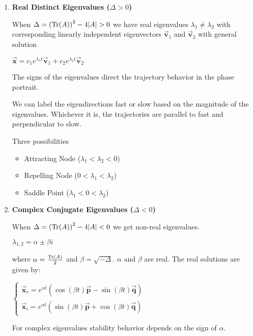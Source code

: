 \documentclass[12pt,landscape,twocolumn]{article}
\let\oldvec\vec
\renewcommand{\vec}[1]{\oldvec{\mathbf{ #1 } } }                    %
\begin{document}
    \begin{enumerate}
        \item \textbf{Real Distinct Eigenvalues ($\Delta > 0$)}

            When $\Delta = {({\rm Tr}(A))}^2 - 4|A| > 0$ we have real eigenvalues $\lambda_1 \neq \lambda_2$ with corresponding linearly independent eigenvectors $\vec{v}_1$ and $\vec{v}_2$ with general solution

            $ \vec{x} = c_1 e^{\lambda_1 t} \vec{v}_1 + c_2 e^{\lambda_2 t} \vec{v}_2 $

            The signs of the eigenvalues direct the trajectory behavior in the phase portrait.

            We can label the eigendirections fast or slow based on the magnitude of the eigenvalues. Whichever it is, the trajectories are parallel to fast and perpendicular to slow.

            Three possibilities

                \begin{itemize}
                    \item Attracting Node ($\lambda_1 < \lambda_2 < 0$)
                    \item Repelling Node ($0 < \lambda_1 < \lambda_2$)
                    \item Saddle Point ($\lambda_1 < 0 < \lambda_2$)
                \end{itemize}

            \item \textbf{Complex Conjugate Eigenvalues ($\Delta < 0$)}

                When $\Delta = {({\rm Tr}(A))}^2 - 4|A| < 0$ we get non-real eigenvalues.

                $ \lambda_{1,2} = \alpha \pm \beta i $

                where $\alpha = \frac{ {\rm Tr}(A)}{2}$ and $\beta = \sqrt{-\Delta}$. $\alpha$ and $\beta$ are real. The real solutions are given by:

                $ \begin{cases}
                        \vec{x}_r = e^{\alpha t} ( \cos(\beta t) \vec{p} - \sin(\beta t)\vec{q})\\
                        \vec{x}_i = e^{\alpha t} ( \sin(\beta t) \vec{p} + \cos(\beta t)\vec{q})
                    \end{cases} $

                For complex eigenvalues stability behavior depends on the sign of $\alpha$.


\end{enumerate}
\end{document}
